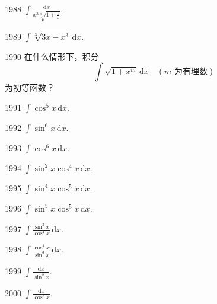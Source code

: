 \begin{prob}[S]{1988}
$\displaystyle \int \frac{\mathrm{d}x}{x^3\sqrt[5]{1 + \frac{1}{x}}}$.
\end{prob}

\begin{prob}[S]{1989}
$\displaystyle \int \sqrt[3]{3x - x^3}\,\mathrm{d}x$.
\end{prob}

\begin{prob}[M]{1990}
在什么情形下，积分
\[
\int \sqrt{1 + x^m}\,\mathrm{d}x \quad (m \text{ 为有理数})
\]
为初等函数？
\end{prob}



\begin{prob}[S]{1991}
$\displaystyle \int \cos^5 x\,\mathrm{d}x$.
\end{prob}

\begin{prob}[S]{1992}
$\displaystyle \int \sin^6 x\,\mathrm{d}x$.
\end{prob}

\begin{prob}[S]{1993}
$\int \cos^6 x \,\mathrm{d}x$.
\end{prob}

\begin{prob}[S]{1994}
$\int \sin^2 x \cos^4 x \,\mathrm{d}x$.
\end{prob}

\begin{prob}[S]{1995}
$\int \sin^4 x \cos^5 x \,\mathrm{d}x$.
\end{prob}

\begin{prob}[S]{1996}
$\int \sin^5 x \cos^5 x \,\mathrm{d}x$.
\end{prob}

\begin{prob}[S]{1997}
$\int \frac{\sin^3 x}{\cos^4 x} \,\mathrm{d}x$.
\end{prob}

\begin{prob}[S]{1998}
$\int \frac{\cos^4 x}{\sin^3 x} \,\mathrm{d}x$.
\end{prob}

\begin{prob}[S]{1999}
$\int \frac{\mathrm{d}x}{\sin^3 x}$.
\end{prob}

\begin{prob}[S]{2000}
$\int \frac{\mathrm{d}x}{\cos^3 x}$.
\end{prob}

